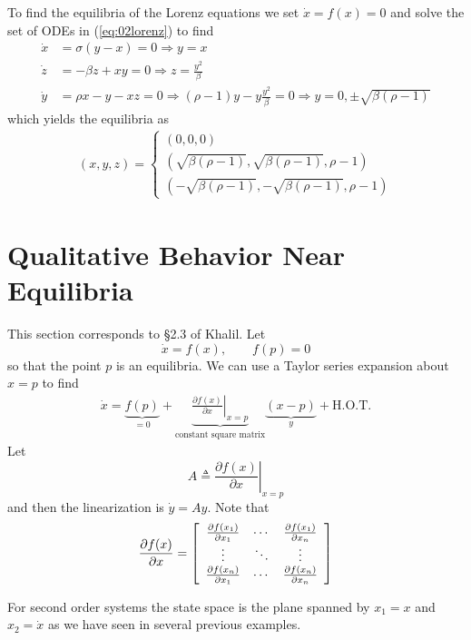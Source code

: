 To find the equilibria of the Lorenz equations we set $\dot{x}=f(x)=0$ and solve the set of ODEs in (\ref{eq:02lorenz}) to find
\begin{align*}
\dot{x} &= \sigma(y-x) = 0 \Rightarrow y = x \\
\dot{z} &= -\beta z + xy = 0 \Rightarrow z = \frac{y^2}{\beta} \\
\dot{y} &= \rho x-y-xz = 0 \Rightarrow (\rho-1)y - y\frac{y^2}{\beta} = 0 \Rightarrow y = 0, \pm\sqrt{\beta(\rho-1)}
\end{align*}
which yields the equilibria as
\begin{align*}
(x,y,z) = \begin{cases} (0,0,0) \\ (\sqrt{\beta(\rho-1)}, \sqrt{\beta(\rho-1)}, \rho-1) \\ (-\sqrt{\beta(\rho-1)}, -\sqrt{\beta(\rho-1)}, \rho-1) \end{cases}
\end{align*}

\section{Qualitative Behavior Near Equilibria}
This section corresponds to \S2.3 of Khalil. Let
$$\dot{x} = f(x), \qquad f(p) = 0$$
so that the point $p$ is an equilibria. We can use a Taylor series expansion about $x=p$ to find
\begin{align*}
\dot{x} = \underbrace{f(p)}_{=0} + \underbrace{\left.\frac{\partial f(x)}{\partial x}\right|_{x=p}}_{\text{constant square matrix}} \underbrace{(x-p)}_{y} + \text{H.O.T.}
\end{align*}
Let
$$A \triangleq \left.\frac{\partial f(x)}{\partial x}\right|_{x=p}$$
and then the linearization is $\dot{y}=Ay$. Note that
\begin{align*}
\frac{\partial f(x)}{\partial x} = \left[\begin{array}{c c c} \frac{\partial f(x_1)}{\partial x_1} & \cdots & \frac{\partial f(x_1)}{\partial x_n} \\ \vdots & \ddots & \vdots \\ \frac{\partial f(x_n)}{\partial x_1} & \cdots & \frac{\partial f(x_n)}{\partial x_n} \end{array}\right]
\end{align*}

For second order systems the state space is the plane spanned by $x_1 = x$ and $x_2 = \dot{x}$ as we have seen in several previous examples.

